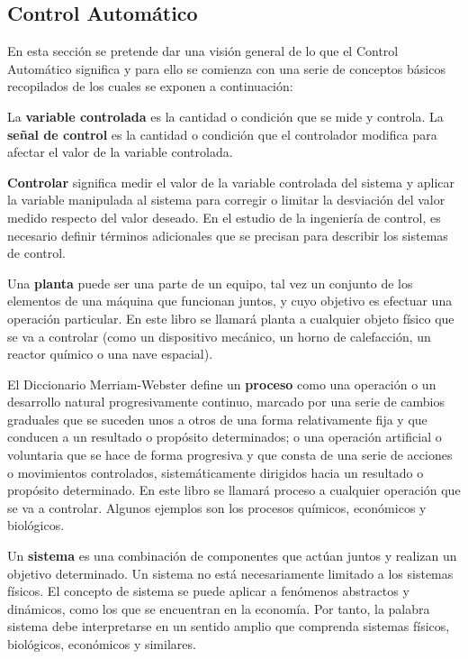\subsection*{Control Automático}

En esta sección se pretende dar una visión general de lo que el Control Automático significa y para ello se comienza con una serie de conceptos básicos recopilados de \cite{Ogata2013} los cuales se exponen a continuación:

La \textbf{variable controlada} es la cantidad o condición que se mide y controla. 
La \textbf{señal de control} es la cantidad o condición que el controlador modifica para afectar el valor de la variable controlada.

\textbf{Controlar} significa medir el valor de la variable controlada del sistema y aplicar la variable manipulada al sistema para corregir o limitar la desviación del valor medido respecto del valor deseado. En el estudio de la ingeniería de control, es necesario definir términos adicionales que se precisan para describir los sistemas de control.

Una \textbf{planta} puede ser una parte de un equipo, tal vez un conjunto de los elementos de una máquina que funcionan juntos, y cuyo objetivo es efectuar una operación particular. En este libro se llamará planta a cualquier objeto físico que se va a controlar (como un dispositivo mecánico, un horno de calefacción, un reactor químico o una nave espacial).

El Diccionario Merriam-Webster define un \textbf{proceso} como una operación o un
desarrollo natural progresivamente continuo, marcado por una serie de cambios graduales que se suceden unos a otros de una forma relativamente fija y que conducen a un resultado o propósito determinados; o una operación artificial o voluntaria que se hace de forma progresiva y que consta de una serie de acciones o movimientos controlados, sistemáticamente dirigidos hacia un resultado o propósito determinado. En este libro se llamará proceso a cualquier operación que se va a controlar. Algunos ejemplos son los procesos químicos, económicos y biológicos.

Un \textbf{sistema} es una combinación de componentes que actúan juntos y realizan un objetivo determinado. Un sistema no está necesariamente limitado a los sistemas físicos. El concepto de sistema se puede aplicar a fenómenos abstractos y dinámicos, como los que se encuentran en la economía. Por tanto, la palabra sistema debe interpretarse en un sentido amplio que comprenda sistemas físicos, biológicos, económicos y similares.


